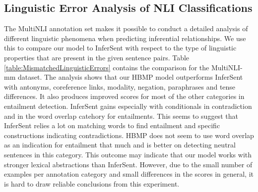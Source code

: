 \documentclass{nle}
\begin{document}
\subsection{Linguistic Error Analysis of NLI Classifications}

The MultiNLI annotation set makes it possible to conduct a detailed analysis of different linguistic phenomena when predicting inferential relationships. We use this to compare our model to InferSent with respect to the type of linguistic properties that are present in the given sentence pairs.
Table \ref{table:MismatchedLinguisticErrors} contains the comparison for the MultiNLI-mm dataset. The analysis shows that our HBMP model outperforms InferSent with antonyms, coreference links, modality, negation, paraphrases and tense differences. It also produces improved scores for most of the other categories in entailment detection. InferSent gains especially with conditionals in contradiction and in the word overlap catehory for entailments. This seems to suggest that InferSent relies a lot on matching words to find entailment and specific constructions indicating contradictions. HBMP does not seem to use word overlap as an indication for entailment that much and is better on detecting neutral sentences in this category. This outcome may indicate that our model works with stronger lexical abstractions than InferSent.
However, due to the small number of examples per annotation category and small differences in the scores in general, it is hard to draw reliable conclusions from this experiment.
\end{document}
